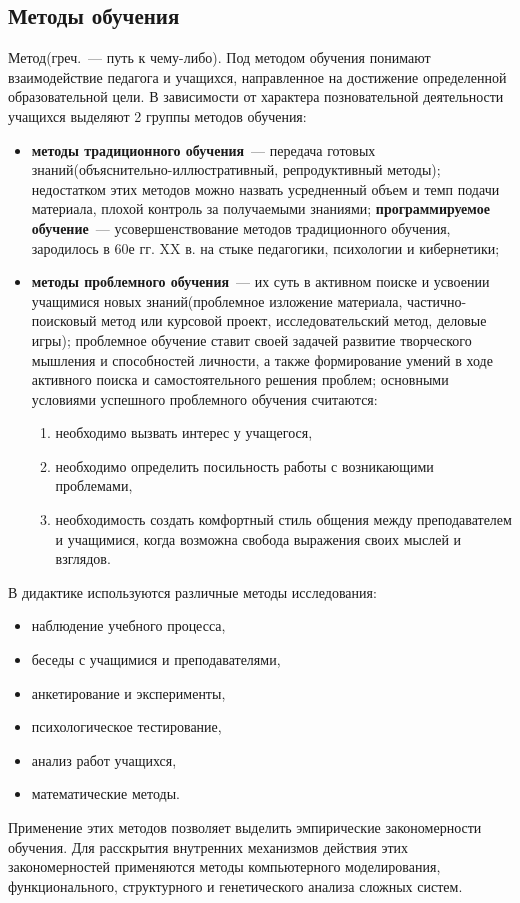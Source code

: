 \subsection{Методы обучения}
Метод(греч.~--- путь к чему-либо). Под методом обучения понимают взаимодействие педагога и учащихся, направленное на достижение определенной образовательной цели. В зависимости от характера позновательной деятельности учащихся выделяют 2 группы методов обучения:
\begin{itemize}
	\item \textbf{методы традиционного обучения}~--- передача готовых знаний(объяснительно-иллюстративный, репродуктивный методы); недостатком этих методов можно назвать усредненный объем и темп подачи материала, плохой контроль за получаемыми знаниями; \textbf{программируемое обучение}~--- усовершенствование методов традиционного обучения, зародилось в 60е гг. XX в. на стыке педагогики, психологии и кибернетики;
	\item \textbf{методы проблемного обучения}~--- их суть в активном поиске и усвоении учащимися новых знаний(проблемное изложение материала, частично-поисковый метод или курсовой проект, исследовательский метод, деловые игры); проблемное обучение ставит своей задачей развитие творческого мышления и способностей личности, а также формирование умений в ходе активного поиска и самостоятельного решения проблем; основными условиями успешного проблемного обучения считаются:
	\begin{enumerate}
		\item необходимо вызвать интерес у учащегося,
		\item необходимо определить посильность работы с возникающими проблемами,
		\item необходимость создать комфортный стиль общения между преподавателем и учащимися, когда возможна свобода выражения своих мыслей и взглядов.
	\end{enumerate}
\end{itemize}
В дидактике используются различные методы исследования:
\begin{itemize}
	\item наблюдение учебного процесса,
	\item беседы с учащимися и преподавателями,
	\item анкетирование и эксперименты,
	\item психологическое тестирование,
	\item анализ работ учащихся,
	\item математические методы.
\end{itemize}
Применение этих методов позволяет выделить эмпирические закономерности обучения. Для расскрытия внутренних механизмов действия этих закономерностей применяются методы компьютерного моделирования, функционального, структурного и генетического анализа сложных систем.

